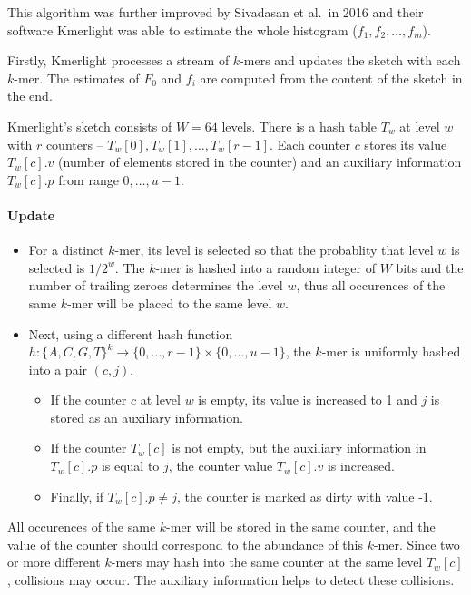 This algorithm was further improved by Sivadasan et al.\ in 2016 \cite{Sivadasan2016} and their software 
Kmerlight was able to estimate the whole histogram ($f_1, f_2, \dots , f_m$).

\medskip
Firstly, Kmerlight processes a stream of $k$-mers and updates the sketch with each $k$-mer.
The estimates of $F_0$ and $f_i$ are computed from the content of the sketch in the end. 

Kmerlight's sketch consists of $W=64$ levels. There is a hash table $T_w$ at level $w$ with $r$ counters -- $T_w[0], T_w[1], \dots, T_w[r-1]$.
Each counter $c$ stores its value $T_w[c].v$ (number of elements stored in the counter) and an auxiliary information $T_w[c].p$ from range
$0, \dots, u-1$.


\paragraph{Update}
\begin{itemize}
\item For a distinct $k$-mer, its level is selected so that the probablity that level $w$ is selected is $1/2^w$. The $k$-mer is hashed
into a random integer of $W$ bits and the number of trailing zeroes determines the level $w$, thus all occurences of the same
$k$-mer will be placed to the same level $w$.

\item Next, using a different hash function $h: \{A, C, G, T\}^k \rightarrow \{ 0, \dots, r-1\} \times \{ 0, \dots, u-1\}$, the $k$-mer is uniformly hashed 
into a pair $(c, j)$. 
\begin{itemize}
\item If the counter $c$ at level $w$ is empty, its value is increased to 1 and $j$ is stored as an auxiliary information.
\item If the counter $T_w[c]$ is not empty, but the auxiliary information in $T_w[c].p$ is equal to $j$, the counter value $T_w[c].v$ is increased.
\item Finally, if $T_w[c].p \neq j$, the counter is marked as dirty with value -1.
\end{itemize}
\end{itemize}
All occurences of the same $k$-mer will be stored in the same counter, and the value of the counter should correspond to the abundance of this $k$-mer.
Since two or more different $k$-mers may hash into the same counter at the same level $T_w[c]$, collisions may occur. The auxiliary information
helps to detect these collisions.


